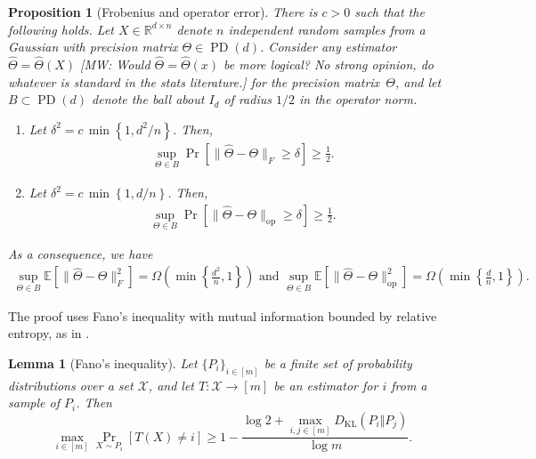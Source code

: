 \documentclass[aos]{imsart}
\newtheorem{prop}[theorem]{Proposition}
\newtheorem{lemma}[theorem]{Lemma}
\theoremstyle{definition}
\numberwithin{equation}{section}
\DeclareMathOperator{\op}{op}
\DeclareMathOperator{\PD}{PD}
\newcommand{\R}{{\mathbb{R}}}
\newcommand{\htheta}{\widehat{\Theta}}
\newcommand{\E}{\mathbb{E}}
\newcommand{\DKL}{D_{\operatorname{KL}}}
\newcommand{\MW}[1]{{\color{red}[MW: #1]}}
\newcommand{\MW}[1]{{}}
\begin{document}
\begin{prop}[Frobenius and operator error]\label{prp:standard-lower}
There is $c > 0$ such that the following holds.
Let $X \in \R^{d \times n}$ denote $n$ independent random samples from a Gaussian with precision matrix $\Theta \in \PD(d)$.
Consider any estimator $\htheta = \htheta(X)$ \MW{Would $\htheta = \htheta(x)$ be more logical? No strong opinion, do whatever is standard in the stats literature.} for the precision matrix~$\Theta$, and let $B\subset \PD(d)$ denote the ball about $I_d$ of radius $1/2$ in the operator norm.
\begin{enumerate}
\item Let $\delta^2 = c \, \min \left\{1,d^2/n\right\}$. Then,
\begin{align}
\sup_{\Theta \in B} \Pr\left[ \| \htheta - \Theta\|_F \geq \delta\right] \geq \frac{1}{2}.\label{eq:frob-lower}
\end{align}
\item Let $\delta^2 = c \, \min \left\{1,d/n\right\}$. Then,
 \begin{align}
\sup_{\Theta \in B} \Pr\left[ \| \htheta - \Theta\|_{\op} \geq \delta\right] \geq \frac{1}{2}. \label{eq:op-lower}
\end{align}
\end{enumerate}
As a consequence, we have
\begin{align*}
  \sup_{\Theta \in B}\E[\| \htheta - \Theta\|_F^2] =\Omega\left( \min \left\{\frac{d^2}{n},1\right\}\right)
\text{ and } \sup_{\Theta \in B}\E[\| \htheta - \Theta\|_{\op}^2] = \Omega\left( \min \left\{\frac{d}{n},1\right\}\right).
\end{align*}
\end{prop}
The proof uses Fano's inequality with mutual information bounded by relative entropy, as in \cite{yang1999information}.

\begin{lemma}[Fano's inequality]\label{lem:fano}
Let $\{P_i\}_{i \in [m]}$ be a finite set of probability distributions over a set $\mathcal X$, and let $T: \mathcal X \to [m]$ be an estimator for $i$ from a sample of $P_i$. Then
\[ \max_{i\in [m]} \Pr_{X \sim P_i}[T(X) \neq i] \geq 1 - \frac{ \log 2 + \max_{i,j \in [m]} \DKL(P_i\Vert  P_j)}{\log m}. \]
\end{lemma}
\end{document}
